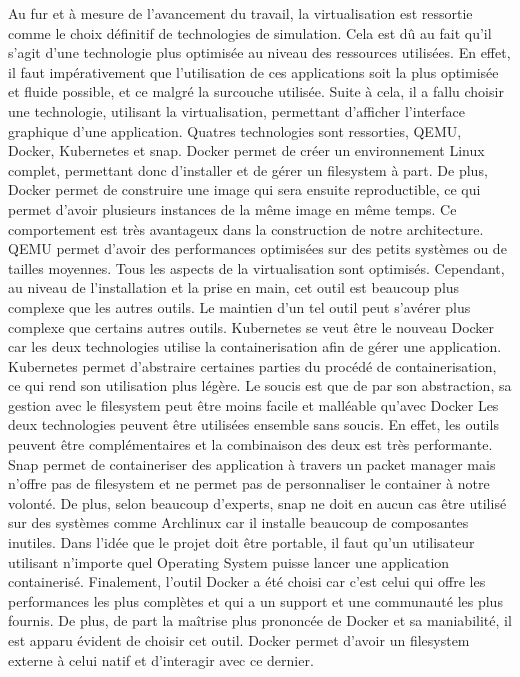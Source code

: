 Au fur et à mesure de l'avancement du travail, la virtualisation est ressortie comme le choix définitif de technologies de simulation.
Cela est dû au fait qu'il s'agit d'une technologie plus optimisée au niveau des ressources utilisées.
En effet, il faut impérativement que l'utilisation de ces applications soit la plus optimisée et fluide possible, et ce malgré la surcouche utilisée.
\newline
Suite à cela, il a fallu choisir une technologie, utilisant la virtualisation, permettant d'afficher l'interface graphique d'une application.
Quatres technologies sont ressorties, QEMU, Docker, Kubernetes et snap.
Docker permet de créer un environnement Linux complet, permettant donc d'installer et de gérer un \gls{filesystem} à part.
De plus, Docker permet de construire une image qui sera ensuite reproductible, ce qui permet d'avoir plusieurs instances de la même image en même temps.
Ce comportement est très avantageux dans la construction de notre architecture.
\newline
QEMU permet d'avoir des performances optimisées sur des petits systèmes ou de tailles moyennes.
Tous les aspects de la virtualisation sont optimisés. 
Cependant, au niveau de l'installation et la prise en main, cet outil est beaucoup plus complexe que les autres outils.
Le maintien d'un tel outil peut s'avérer plus complexe que certains autres outils. 
\newline
Kubernetes se veut être le nouveau Docker car les deux technologies utilise la containerisation afin de gérer une application.
Kubernetes permet d'abstraire certaines parties du procédé de containerisation, ce qui rend son utilisation plus légère.
Le soucis est que de par son abstraction, sa gestion avec le \gls{filesystem} peut être moins facile et malléable qu'avec Docker
Les deux technologies peuvent être utilisées ensemble sans soucis.
En effet, les outils peuvent être complémentaires et la combinaison des deux est très performante.
\newline
Snap permet de containeriser des application à travers un packet manager mais n'offre pas de \gls{filesystem} et ne permet pas de personnaliser le container à notre volonté.
De plus, selon beaucoup d'experts, snap ne doit en aucun cas être utilisé sur des systèmes comme Archlinux car il installe beaucoup de composantes inutiles.
Dans l'idée que le projet doit être portable, il faut qu'un utilisateur utilisant n'importe quel \gls{Operating System} puisse lancer une application containerisé.
\newline
Finalement, l'outil Docker a été choisi car c'est celui qui offre les performances les plus complètes et qui a un support et une communauté les plus fournis.
De plus, de part la maîtrise plus prononcée de Docker et sa maniabilité, il est apparu évident de choisir cet outil.
Docker permet d'avoir un \gls{filesystem} externe à celui natif et d'interagir avec ce dernier.


